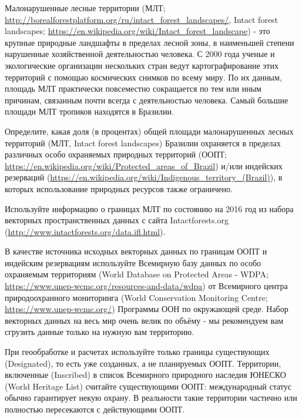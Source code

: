 
Малонарушенные лесные территории (МЛТ; \url{http://borealforestplatform.org/ru/intact_forest_landscapes/}, 
Intact forest landscapes; \url{https://en.wikipedia.org/wiki/Intact_forest_landscape}) - это крупные природные ландшафты в пределах лесной зоны, в наименьшей степени нарушенные хозяйственной деятельностью человека. С 2000 года ученые и экологические организации нескольких стран ведут картографирование этих территорий с помощью космических снимков по всему миру. По их данным, площадь МЛТ практически повсеместно сокращается по тем или иным причинам, связанным почти всегда с деятельностью человека. Самый большие площади МЛТ тропиков находятся в Бразилии. 

Определите, какая доля (в процентах) общей площади малонарушенных лесных территорий 
(МЛТ, Intact forest landscapes) Бразилии охраняется в пределах различных особо охраняемых природных территорий 
(ООПТ; \url{https://en.wikipedia.org/wiki/Protected_areas_of_Brazil}) и/или индейских резерваций (\url{https://en.wikipedia.org/wiki/Indigenous_territory_(Brazil)}), в которых использование природных ресурсов также ограничено.

Используйте информацию о границах МЛТ по состоянию на 2016 год из набора векторных пространственных данных с 
сайта Intactforests.org\\ (\url{http://www.intactforests.org/data.ifl.html}).

В качестве источника исходных векторных данных по границам ООПТ и индейским резервациям используйте 
Всемирную базу данных по особо охраняемым территориям (World Database on Protected Areas - WDPA; \url{https://www.unep-wcmc.org/resources-and-data/wdpa}) 
от Всемирного центра природоохранного мониторинга (World Conservation Monitoring Centre; \url{https://www.unep-wcmc.org/}) Программы ООН по окружающей среде. Набор векторных данных на весь мир очень велик по объёму - мы рекомендуем вам сгрузить данные только на нужную вам территорию.

При геообработке и расчетах используйте только границы существующих \linebreak (Designated), то есть уже созданных, а не планируемых ООПТ. Территории, включенные (Inscribed) в список Всемирного природного наследия ЮНЕСКО (World Heritage List) считайте существующими ООПТ: международный статус обычно гарантирует некую охрану. В реальности такие территории частично или полностью пересекаются с действующими ООПТ.

